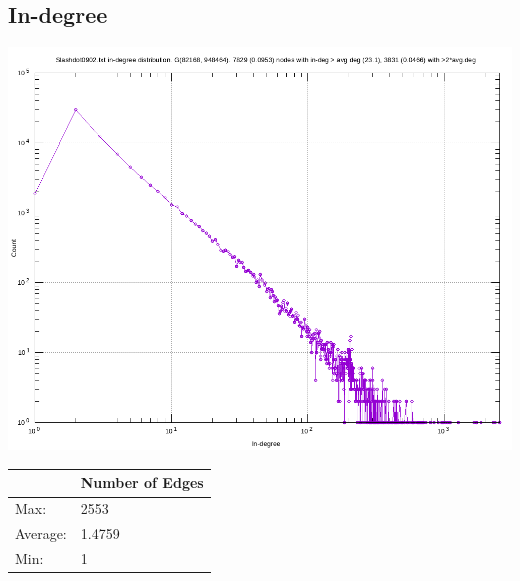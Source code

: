 \documentclass{subfiles}
\begin{document}
  \subsection{In-degree}
  \includegraphics[scale=0.6]{InDegDist.png}\\
  \begin{center}
  \begin{tabular}{|l|l|}
    \hline
    & Number of Edges\\
    \hline
    Max: & 2553\\
    \hline
    Average: & 1.4759\\
    \hline
    Min: & 1\\
    \hline
  \end{tabular}
  \end{center}
\end{document}
